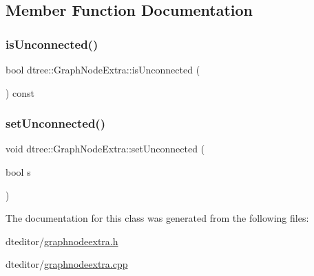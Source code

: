 \subsection{Member Function Documentation}
\mbox{\label{classdtree_1_1_graph_node_extra_a0a06b2a50381261d6597d5c04068f0c9}} 
\subsubsection{\texorpdfstring{isUnconnected()}{isUnconnected()}}
{\footnotesize\ttfamily bool dtree\+::\+Graph\+Node\+Extra\+::is\+Unconnected (\begin{DoxyParamCaption}{ }\end{DoxyParamCaption}) const\hspace{0.3cm}{\ttfamily [inline]}}

\mbox{\label{classdtree_1_1_graph_node_extra_a3507dfbbb8e8b85f304212d34b2d8727}} 
\subsubsection{\texorpdfstring{setUnconnected()}{setUnconnected()}}
{\footnotesize\ttfamily void dtree\+::\+Graph\+Node\+Extra\+::set\+Unconnected (\begin{DoxyParamCaption}\item[{bool}]{s }\end{DoxyParamCaption})\hspace{0.3cm}{\ttfamily [inline]}}



The documentation for this class was generated from the following files\+:\begin{DoxyCompactItemize}
\item 
dteditor/\mbox{\hyperlink{graphnodeextra_8h}{graphnodeextra.\+h}}\item 
dteditor/\mbox{\hyperlink{graphnodeextra_8cpp}{graphnodeextra.\+cpp}}\end{DoxyCompactItemize}
